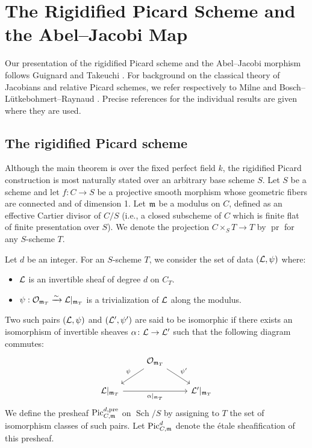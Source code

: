 \section{The Rigidified Picard Scheme and the Abel--Jacobi Map}\label{section:generalized-picard-and-abel-jacobi}

Our presentation of the rigidified Picard scheme and the Abel--Jacobi
morphism follows Guignard \cite[\S4]{Guignard2018} and
Takeuchi \cite[\S3]{takeuchi2018blow}. For background on the classical
theory of Jacobians and relative Picard schemes, we refer respectively to
Milne \cite{milneAV} and Bosch--L\"utkebohmert--Raynaud
\cite[Chapter~9]{BLR1990}. Precise references for the individual results
are given where they are used.

\subsection*{The rigidified Picard scheme}
Although the main theorem is over the fixed perfect field $k$, the
rigidified Picard construction is most naturally stated over an arbitrary
base scheme $S$.
Let $S$ be a scheme and let $f:C\to S$ be a projective smooth morphism whose geometric fibers are connected and of dimension 1. Let $\mdls$ be a modulus on $C$, defined as an effective Cartier divisor of $C/S$
(i.e., a closed subscheme of $C$ which is finite flat of finite presentation over $S$).
We denote the projection $C \times_S T \to T$ by $\operatorname{pr}$ for any $S$-scheme $T$.

Let $d$ be an integer. For an $S$-scheme $T$, we consider the set of data $(\cL, \psi)$ where:
\begin{itemize}
    \item $\cL$ is an invertible sheaf of degree $d$ on $C_T$.
    \item $\psi: \Oo_{\mdls_T} \xrightarrow{\sim} \cL|_{\mdls_T}$ is a trivialization of $\cL$ along the modulus.
\end{itemize}
Two such pairs $(\cL, \psi)$ and $(\cL', \psi')$ are said to be isomorphic if there exists an isomorphism of invertible sheaves $\alpha\colon \cL \to \cL'$ such that the following diagram commutes:
\[
\begin{tikzcd}
& \Oo_{\mdls_T} \arrow[dl, "\psi"'] \arrow[dr, "\psi'"] & \\
\cL|_{\mdls_T} \arrow[rr, "\alpha|_{\mdls_T}"'] & & \cL'|_{\mdls_T}
\end{tikzcd}
\]
We define the presheaf $\operatorname{Pic}_{C,\mdls}^{d,\mathrm{pre}}$ on
$\operatorname{Sch}/S$ by assigning to $T$ the set of isomorphism classes
of such pairs. Let $\PicCm[d]$ denote the \'etale sheafification of this
presheaf.

